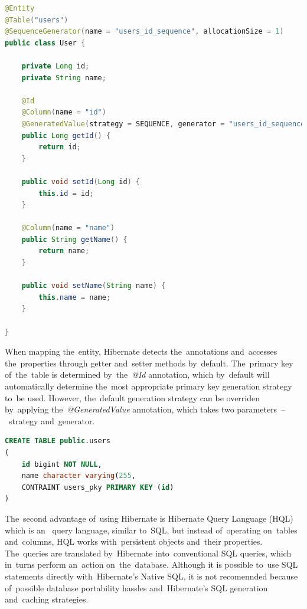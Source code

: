 \vspace{1mm}
\begin{lstlisting}[caption=POJO class that features the~advantages of~ORM.,
style=dp-default, language=Java, label=lst-table]
@Entity
@Table("users")
@SequenceGenerator(name = "users_id_sequence", allocationSize = 1)
public class User {

	private Long id;
	private String name;
	
	@Id
	@Column(name = "id")
	@GeneratedValue(strategy = SEQUENCE, generator = "users_id_sequence")
	public Long getId() {
		return id;
	}
	
	public void setId(Long id) {
		this.id = id;
	}
	
	@Column(name = "name")
	public String getName() {
		return name;
	}
	
	public void setName(String name) {
		this.name = name;
	}

}
\end{lstlisting}

When mapping the~entity, Hibernate detects the~annotations and~accesses
the~properties through getter and~setter methods by~default. The~primary key
of~the~table is determined by~the~\textit{@Id} annotation, which by~default will
automatically determine the~most appropriate primary key generation strategy
to~be used. However, the~default generation strategy can be overriden
by~applying the~\textit{@GeneratedValue} annotation, which takes two
parameters~--~strategy and~generator.

\vspace{1mm}
\begin{lstlisting}[caption=The~SQL code that is generated by~Hibernate when
mapping the~entity from~the~listing~\ref{lst-table}, style=dp-default,
language=SQL, label=lst-table-sql]
CREATE TABLE public.users
(
	id bigint NOT NULL,
	name character varying(255,
	CONTRAINT users_pky PRIMARY KEY (id)
)
\end{lstlisting}

The~second advantage of~using Hibernate is Hibernate Query Language (HQL) which
is an~ query language, similar to~SQL, but instead
of~operating on~tables and~columns, HQL works with~persistent objects and~their
properties. The~queries are translated by~Hibernate into~conventional SQL
queries, which in~turns perform an~action on~the~database. Although it is
possible to~use SQL statements directly with~Hibernate's Native SQL, it is not
recomennded because of~possible database portability hassles and~Hibernate's SQL
generation and~caching strategies.

